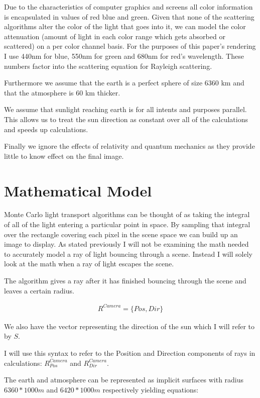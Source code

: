 \documentclass[12pt, letterpaper]{article}
\begin{document}
Due to the characteristics of computer graphics and screens all color
information is encapsulated in values of red blue and green. Given that none of
the scattering algorithms alter the color of the light that goes into it, we can
model the color attenuation (amount of light in each color range which gets
absorbed or scattered) on a per color channel basis. For the purposes of this
paper's rendering I use 440nm for blue, 550nm for green and 680nm for red's
wavelength. These numbers factor into the scattering equation for Rayleigh
scattering.

Furthermore we assume that the earth is a perfect sphere of size 6360 km and
that the atmosphere is 60 km thicker.

We assume that sunlight reaching earth is for all intents and purposes parallel.
This allows us to treat the sun direction as constant over all of the
calculations and speeds up calculations.

Finally we ignore the effects of relativity and quantum mechanics as they
provide little to know effect on the final image.

\section{Mathematical Model}

Monte Carlo light transport algorithms can be thought of as taking the integral
of all of the light entering a particular point in space. By sampling that
integral over the rectangle covering each pixel in the scene space we can build
up an image to display. As stated previously I will not be examining the math
needed to accurately model a ray of light bouncing through a scene. Instead I
will solely look at the math when a ray of light escapes the scene.

The algorithm gives a ray after it has finished bouncing through the scene and
leaves a certain radius.

\begin{gather*}
  R^{Camera} = \{ Pos, Dir \}
\end{gather*}

We also have the vector representing the direction of the sun which I will refer
to by $S$.

I will use this syntax to refer to the Position and Direction components of rays
in calculations: $R^{Camera}_{Pos}$ and $R^{Camera}_{Dir}$.

The earth and atmosphere can be represented as implicit surfaces with radius
$6360 * 1000 m$ and $6420 * 1000 m$ \cite{scratch} respectively yielding equations:
\end{document}
